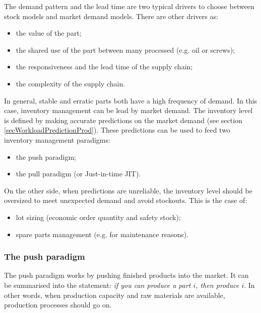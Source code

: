The demand pattern and the lead time are two typical drivers to choose between stock models and market demand models. There are other drivers as:
\begin{itemize}
    \item the value of the part;
    \item the shared use of the part between many processed (e.g. oil or screws);
    \item the responsiveness and the lead time of the supply chain;
    \item the complexity of the supply chain.

\end{itemize}

In general, stable and erratic parts both have a high frequency of demand. In this case, inventory management can be lead by market demand. The inventory level is defined by making accurate predictions on the market demand (see section \ref{secWorkloadPredictionProd}). These predictions can be used to feed two inventory management paradigms:

\begin{itemize}
    \item the push paradigm;
    \item the pull paradigm (or Just-in-time JIT).

\end{itemize}

On the other side, when predictions are unreliable, the inventory level should be oversized to meet unexpected demand and avoid stockouts. This is the case of:

\begin{itemize}
    \item lot sizing (economic order quantity and safety stock);
    \item spare parts management (e.g. for maintenance reasons).

\end{itemize}

\subsubsection{The push paradigm}
The push paradigm works by pushing finished products into the market. It can be summarised into the statement: \textit{if you can produce a part $i$, then produce $i$}. In other words, when production capacity and raw materials are available, production processes should go on. \par

